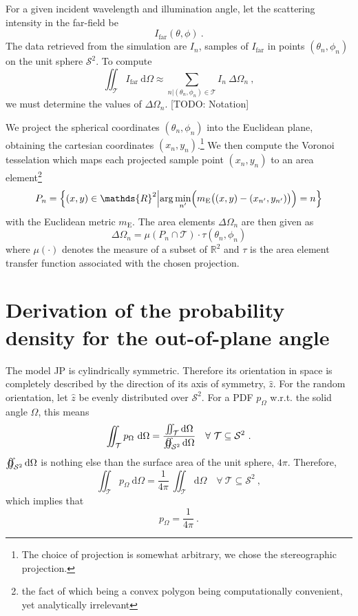 \documentclass[10pt]{article}
\begin{document}
For a given incident wavelength and illumination angle, let the scattering intensity in the far-field be
$$I_\mathrm{far}(\theta,\phi)\ .$$
The data retrieved from the simulation are $I_n$, samples of $I_\mathrm{far}$ in points $\left( \theta_n, \phi_n \right)$ on the unit sphere $\mathcal{S}^2$. 
To compute
$$
    \iint_{\mathcal{T}} I_\mathrm{far} \ \mathrm{d}\Omega \approx \sum_{n \vert \left( \theta_n, \phi_n \right)\in\mathcal{T}} I_n \ \Delta\Omega_n \ , 
$$
we must determine the values of $\Delta\Omega_n$. [TODO: Notation]

We project the spherical coordinates $\left( \theta_n, \phi_n \right)$ into the Euclidean plane, obtaining the cartesian coordinates $(x_n, y_n)$.\footnote{The choice of projection is somewhat arbitrary, we chose the stereographic projection.} 
We then compute the Voronoi tesselation which maps each projected sample point $(x_n, y_n)$ to an area element\footnote{the fact of which being a convex polygon being computationally convenient, yet analytically irrelevant} 
$$
P_n = \left\lbrace 
(x,y) \in \mathds{R}^2 
\middle\vert 
\mathrm{arg}\min\limits_{n'} \Bigl( m_\mathrm{E}\bigl( (x,y)-(x_{n'},y_{n'}) \bigr) \Bigr)
= n
\right\rbrace
$$ 
with the Euclidean metric $m_\mathrm{E}$. 
The area elements $\Delta\Omega_n$ are then given as 
$$
\Delta\Omega_n
=
\mu\left(
P_n \cap \mathcal{T}
\right) \cdot \tau\left( \theta_n, \phi_n \right)
$$
where $\mu(\cdot)$ denotes the measure of a subset of $\mathds{R}^2$ and $\tau$ is the area element transfer function associated with the chosen projection. 





\section*{Derivation of the probability density for the out-of-plane angle}

The model JP is cylindrically symmetric. Therefore its orientation in space is completely described by the direction of its axis of symmetry, $\hat{z}$. 
For the random orientation, let $\hat{z}$ be evenly distributed over $\mathcal{S}^2$. 
For a PDF $p_\Omega$ w.r.t. the solid angle $\Omega$, this means
$$
\iint_{\mathcal{T}} p_\Omega \ \mathrm{d}\Omega
=
\frac{
\iint_{\mathcal{T}} \mathrm{d}\Omega
}{
\varoiint_{\mathcal{S}^2} \mathrm{d}\Omega
}
\quad\forall\ \mathcal{T}\subseteq\mathcal{S}^2
\ .
$$
$\varoiint_{\mathcal{S}^2} \mathrm{d}\Omega$ is nothing else than the surface area of the unit sphere, $4\pi$. 
Therefore, 
$$
\iint_{\mathcal{T}} p_\Omega \ \mathrm{d}\Omega
=
\frac{1}{4\pi}\ 
\iint_{\mathcal{T}} \mathrm{d}\Omega
\quad\forall\ \mathcal{T}\subseteq\mathcal{S}^2
\ ,
$$
which implies that
$$
p_\Omega=\frac{1}{4\pi}\ .
$$
\end{document}
